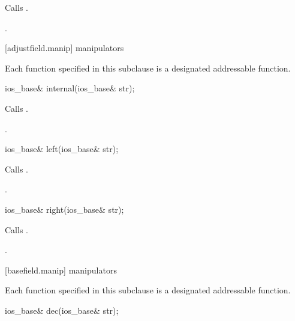 \begin{itemdescr}
\pnum
\effects
Calls
.

\pnum
\returns
{}.
\end{itemdescr}

[adjustfield.manip]{ manipulators}

\pnum
Each function specified in this subclause
is a designated addressable function.

%
\begin{itemdecl}
ios_base& internal(ios_base& str);
\end{itemdecl}

\begin{itemdescr}
\pnum
\effects
Calls
.

\pnum
\returns
{}.
\end{itemdescr}

\begin{indexed}{}
\begin{itemdecl}
ios_base& left(ios_base& str);
\end{itemdecl}
\end{indexed}

\begin{itemdescr}
\pnum
\effects
Calls
.

\pnum
\returns
{}.
\end{itemdescr}

\begin{indexed}{}
\begin{itemdecl}
ios_base& right(ios_base& str);
\end{itemdecl}
\end{indexed}

\begin{itemdescr}
\pnum
\effects
Calls
.

\pnum
\returns
{}.
\end{itemdescr}

[basefield.manip]{ manipulators}

\pnum
Each function specified in this subclause
is a designated addressable function.

\begin{indexed}{}
\begin{itemdecl}
ios_base& dec(ios_base& str);
\end{itemdecl}
\end{indexed}


